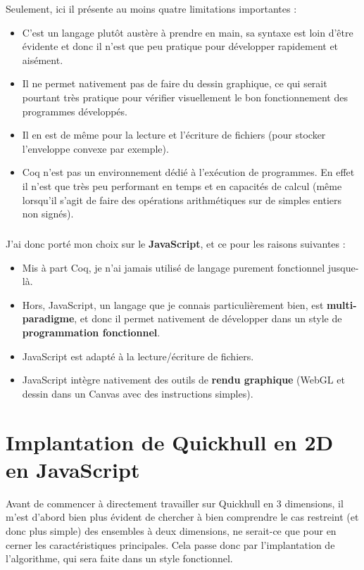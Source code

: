 \documentclass[]{article}
\begin{document}
Seulement, ici il présente au moins quatre limitations importantes :
\begin{itemize}
	\item C'est un langage plutôt austère à prendre en main, sa syntaxe est loin d'être évidente et donc il n'est que peu pratique pour développer rapidement et aisément.
	\item Il ne permet nativement pas de faire du dessin graphique, ce qui serait pourtant très pratique pour vérifier visuellement le bon fonctionnement des programmes développés.
	\item Il en est de même pour la lecture et l'écriture de fichiers (pour stocker l'enveloppe convexe par exemple).
	\item Coq n'est pas un environnement dédié à l'exécution de programmes. En effet il n'est que très peu performant en temps et en capacités de calcul (même lorsqu'il s'agit de faire des opérations arithmétiques sur de simples entiers non signés).
\end{itemize}

\subparagraph{}
J'ai donc porté mon choix sur le \textbf{JavaScript}, et ce pour les raisons suivantes :
\begin{itemize}
	\item Mis à part Coq, je n'ai jamais utilisé de langage purement fonctionnel jusque-là.
	\item Hors, JavaScript, un langage que je connais particulièrement bien, est \textbf{multi-paradigme}, et donc il permet nativement de développer dans un style de \textbf{programmation fonctionnel}.
	\item JavaScript est adapté à la lecture/écriture de fichiers.
	\item JavaScript intègre nativement des outils de \textbf{rendu graphique} (WebGL et dessin dans un Canvas avec des instructions simples).
\end{itemize}

\section{Implantation de Quickhull en 2D en JavaScript}
Avant de commencer à directement travailler sur Quickhull en 3 dimensions, il m'est d'abord bien plus évident de chercher à bien comprendre le cas restreint (et donc plus simple) des ensembles à deux dimensions, ne serait-ce que pour en cerner les caractéristiques principales. Cela passe donc par l'implantation de l'algorithme, qui sera faite dans un style fonctionnel.
\end{document}
